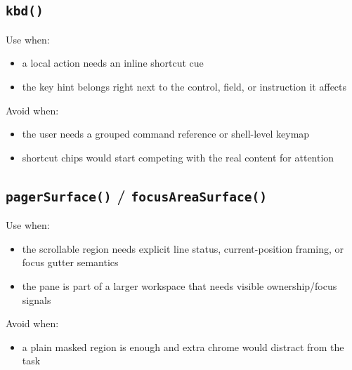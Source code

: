 \subsection{\texorpdfstring{\texttt{k\allowbreak{}b\allowbreak{}d\allowbreak{}(\allowbreak{})}}{}}\label{record-023-kbd}

Use when:

\begin{itemize}
\tightlist
\item
  a local action needs an inline shortcut cue
\item
  the key hint belongs right next to the control, field, or instruction it affects
\end{itemize}

Avoid when:

\begin{itemize}
\tightlist
\item
  the user needs a grouped command reference or shell-level keymap
\item
  shortcut chips would start competing with the real content for attention
\end{itemize}

\subsection{\texorpdfstring{\texttt{p\allowbreak{}a\allowbreak{}g\allowbreak{}e\allowbreak{}r\allowbreak{}S\allowbreak{}u\allowbreak{}r\allowbreak{}f\allowbreak{}a\allowbreak{}c\allowbreak{}e\allowbreak{}(\allowbreak{})} / \texttt{f\allowbreak{}o\allowbreak{}c\allowbreak{}u\allowbreak{}s\allowbreak{}A\allowbreak{}r\allowbreak{}e\allowbreak{}a\allowbreak{}S\allowbreak{}u\allowbreak{}r\allowbreak{}f\allowbreak{}a\allowbreak{}c\allowbreak{}e\allowbreak{}(\allowbreak{})}}{ / }}\label{record-023-pagersurface-focusareasurface}

Use when:

\begin{itemize}
\tightlist
\item
  the scrollable region needs explicit line status, current-position framing, or focus gutter semantics
\item
  the pane is part of a larger workspace that needs visible ownership/focus signals
\end{itemize}

Avoid when:

\begin{itemize}
\tightlist
\item
  a plain masked region is enough and extra chrome would distract from the task
\end{itemize}

